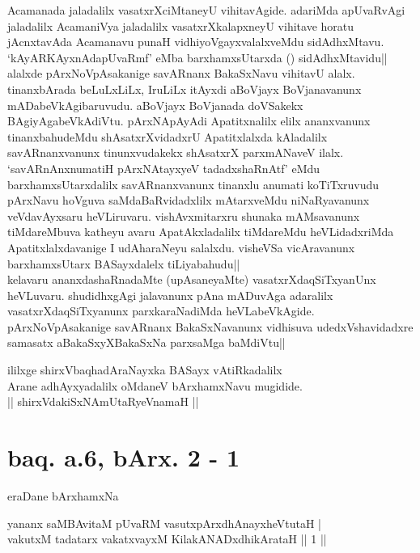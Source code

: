 \begin{artha}
{Acamanada jaladalilx vasatxrXciMtaneyU vihitavAgide. adariMda 
apUvaRvAgi jaladalilx AcamaniVya jaladalilx vasatxrXkalapxneyU 
vihitave horatu jAcnxtavAda Acamanavu punaH vidhiyoVgayxvalalxveMdu 
sidAdhxMtavu.\\
`kAyARKAyxnAdapUvaRmf' eMba barxhamxsUtarxda () sidAdhxMtavidu|| 
alalxde pArxNoVpAsakanige savARnanx BakaSxNavu vihitavU alalx. 
tinanxbArada beLuLxLiLx, IruLiLx itAyxdi aBoVjayx BoVjanavanunx 
mADabeVkAgibaruvudu. aBoVjayx BoVjanada doVSakekx BAgiyAgabeVkAdiVtu. 
pArxNApAyAdi Apatitxnalilx elilx ananxvanunx tinanxbahudeMdu 
shAsatxrXvidadxrU Apatitxlalxda kAladalilx savARnanxvanunx 
tinunxvudakekx shAsatxrX parxmANaveV ilalx. `savARnAnxnumatiH 
pArxNAtayxyeV tadadxshaRnAtf' eMdu barxhamxsUtarxdalilx 
savARnanxvanunx tinanxlu anumati koTiTxruvudu pArxNavu hoVguva 
saMdaBaRvidadxlilx mAtarxveMdu niNaRyavanunx veVdavAyxsaru 
heVLiruvaru. vishAvxmitarxru shunaka mAMsavanunx tiMdareMbuva katheyu 
avaru ApatAkxladalilx tiMdareMdu heVLidadxriMda Apatitxlalxdavanige I 
udAharaNeyu salalxdu. visheVSa vicAravanunx barxhamxsUtarx 
BASayxdalelx tiLiyabahudu||}\\
kelavaru ananxdashaRnadaMte (upAsaneyaMte) vasatxrXdaqSiTxyanUnx 
heVLuvaru. shudidhxgAgi jalavanunx pAna mADuvAga adaralilx 
vasatxrXdaqSiTxyanunx parxkaraNadiMda heVLabeVkAgide. 
pArxNoVpAsakanige savARnanx BakaSxNavanunx vidhisuva udedxVshavidadxre 
samasatx aBakaSxyXBakaSxNa parxsaMga baMdiVtu||
\end{artha}

\begin{center}
ililxge shirxVbaqhadAraNayxka BASayx vAtiRkadalilx\\
Arane adhAyxyadalilx oMdaneV bArxhamxNavu mugidide.\\
|| shirxVdakiSxNAmUtaRyeVnamaH ||
\end{center}


\section*{baq. a.6, bArx. 2 - 1}

\begin{center}
eraDane bArxhamxNa
\end{center}

\begin{shl}
yananx saMBAvitaM pUvaRM vasutxpArxdhAnayxheVtutaH | \\
vakutxM tadatarx vakatxvayxM KilakANADxdhikArataH \hfill|| 1 || 
\end{shl}


